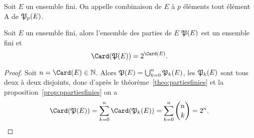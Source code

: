 \begin{defdef}
  Soit $E$ un ensemble fini. On appelle combinaison de $E$ à $p$ éléments tout élément A de $\mathfrak{P}_p(E)$.
\end{defdef}
\begin{prop}
  Soit $E$ un ensemble fini, alors l'ensemble des parties de $E$ $\mathfrak{P}(E)$ est un ensemble fini et
  \begin{equation}
    \Card(\Part(E))=2^{\Card(E)}.
  \end{equation}
\end{prop}
\begin{proof}
  Soit $n=\Card(E)\in \N$. Alors $\mathfrak{P}(E)=\bigcup_{k=0}^{n}\mathfrak{P}_k(E)$, les $\mathfrak{P}_k(E)$ sont tous deux à deux disjoints, donc d'après le théorème~\ref{theo:partiesfinies} et la proposition~\ref{prop:ppartiesfinies} on a
  \begin{equation}
    \Card(\Part(E))=\sum_{k=0}^n \Card(\Part_k(E))=\sum_{k=0}^n \binom{n}{k}=2^n.
  \end{equation}
\end{proof}